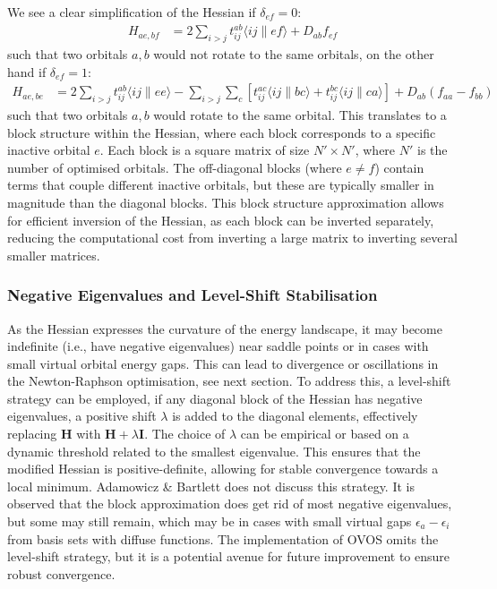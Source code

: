 We see a clear simplification of the Hessian if $\delta_{ef}=0$:
\begin{align}
    H_{ae,bf} &= 2\sum_{i>j} t_{ij}^{ab}\langle ij\|ef\rangle
               + D_{ab} f_{ef}
\end{align}
such that two orbitals $a,b$ would not rotate to the same orbitals, on the other hand if $\delta_{ef}=1$:
\begin{align}
    H_{ae,be} &= 2\sum_{i>j} t_{ij}^{ab}\langle ij\|ee\rangle
               - \sum_{i>j}\sum_c [t_{ij}^{ac}\langle ij\|bc\rangle
               + t_{ij}^{bc}\langle ij\|ca\rangle]
               + D_{ab}(f_{aa} - f_{bb})
\end{align}
such that two orbitals $a,b$ would rotate to the same orbital. This translates to a block structure within the Hessian, where each block corresponds to a specific inactive orbital $e$. Each block is a square matrix of size $N' \times N'$, where $N'$ is the number of optimised orbitals. The off-diagonal blocks (where $e \neq f$) contain terms that couple different inactive orbitals, but these are typically smaller in magnitude than the diagonal blocks. This block structure approximation allows for efficient inversion of the Hessian, as each block can be inverted separately, reducing the computational cost from inverting a large matrix to inverting several smaller matrices.

\subsubsection{Negative Eigenvalues and Level-Shift Stabilisation}

As the Hessian expresses the curvature of the energy landscape, it may become indefinite (i.e., have negative eigenvalues) near saddle points or in cases with small virtual orbital energy gaps. This can lead to divergence or oscillations in the Newton-Raphson optimisation, see next section. To address this, a level-shift strategy can be employed, if any diagonal block of the Hessian has negative eigenvalues, a positive shift $\lambda$ is added to the diagonal elements, effectively replacing $\mathbf{H}$ with $\mathbf{H} + \lambda\mathbf{I}$. The choice of $\lambda$ can be empirical or based on a dynamic threshold related to the smallest eigenvalue. This ensures that the modified Hessian is positive-definite, allowing for stable convergence towards a local minimum. Adamowicz \& Bartlett does not discuss this strategy. It is observed that the block approximation does get rid of most negative eigenvalues, but some may still remain, which may be in cases with small virtual gaps $\epsilon_a - \epsilon_i$ from basis sets with diffuse functions. The implementation of OVOS omits the level-shift strategy, but it is a potential avenue for future improvement to ensure robust convergence.



